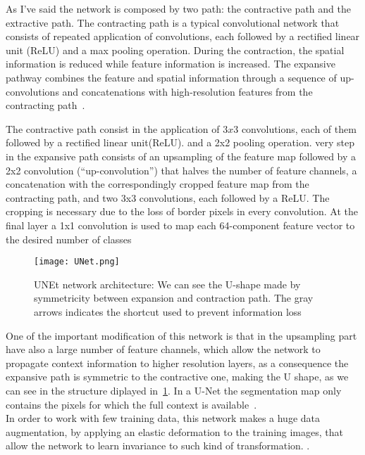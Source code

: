 \documentclass{standalone}
\begin{document}
		
		As I've said the network is composed by two path: the contractive path and the extractive path. The contracting path is a typical convolutional network that consists of repeated application of convolutions, each followed by a rectified linear unit (ReLU) and a max pooling operation. During the contraction, the spatial information is reduced while feature information is increased. The expansive pathway combines the feature and spatial information through a sequence of up-convolutions and concatenations with high-resolution features from the contracting path~\cite{ART:Johannes}.
		
		The contractive path consist in the application of $3x3$ convolutions, each of them followed by a rectified linear unit(ReLU). and a 2x2 pooling operation. very step in the expansive path consists of an upsampling of the feature map followed by a 2x2 convolution (“up-convolution”) that halves the number of feature channels, a concatenation with the correspondingly cropped feature map from the contracting path, and two 3x3 convolutions, each followed by a ReLU. The cropping is necessary due to the loss of border pixels in every convolution. At the final layer a 1x1 convolution is used to map each 64-component feature vector to the desired number of classes
		
		\begin{figure}[h!]
			\centering
				\texttt{[image: UNet.png]}
					\caption{UNEt network architecture: We can see the U-shape made by symmetricity between expansion and contraction path. The gray arrows indicates the shortcut used to prevent information loss}\label{fig:UNet}
		\end{figure}
	
		One of the important modification of this network is that in the upsampling part  have also a large number of feature channels, which allow the network to propagate context information to higher resolution layers, as a consequence the expansive path is symmetric to the contractive one, making the U shape, as we can see in the structure diplayed in \figurename\,\ref{fig:UNet}. In a U-Net the segmentation map only contains the pixels for which the full context is available~\cite{ART:Johannes}.\\
		In order to work with few training data, this network makes a huge data augmentation, by applying an elastic deformation to the training images, that allow the network to learn invariance to such kind of transformation. 
. 
\end{document}
